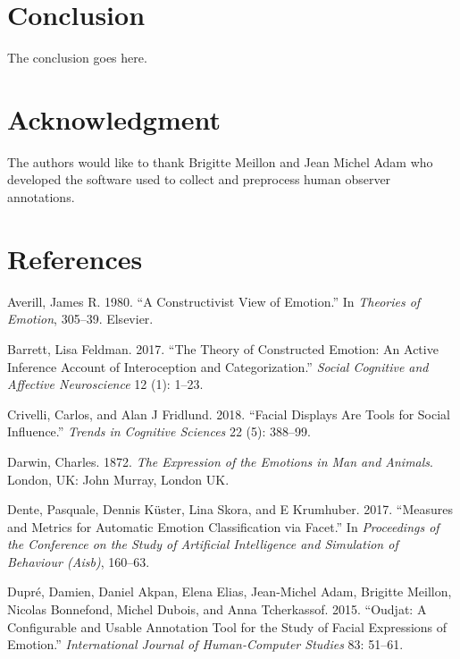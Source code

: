 \documentclass[conference,final,]{IEEEtran}
\begin{document}
\hypertarget{conclusion}{%
\section{Conclusion}\label{conclusion}}

The conclusion goes here.

\hypertarget{acknowledgment}{%
\section{Acknowledgment}\label{acknowledgment}}

The authors would like to thank Brigitte Meillon and Jean Michel Adam
who developed the software used to collect and preprocess human observer
annotations.

\hypertarget{references}{%
\section*{References}\label{references}}

\hypertarget{refs}{}
\leavevmode\hypertarget{ref-averill1980constructivist}{}%
Averill, James R. 1980. ``A Constructivist View of Emotion.'' In
\emph{Theories of Emotion}, 305--39. Elsevier.

\leavevmode\hypertarget{ref-barrett2017theory}{}%
Barrett, Lisa Feldman. 2017. ``The Theory of Constructed Emotion: An
Active Inference Account of Interoception and Categorization.''
\emph{Social Cognitive and Affective Neuroscience} 12 (1): 1--23.

\leavevmode\hypertarget{ref-crivelli2018facial}{}%
Crivelli, Carlos, and Alan J Fridlund. 2018. ``Facial Displays Are Tools
for Social Influence.'' \emph{Trends in Cognitive Sciences} 22 (5):
388--99.

\leavevmode\hypertarget{ref-darwin1872expression}{}%
Darwin, Charles. 1872. \emph{The Expression of the Emotions in Man and
Animals}. London, UK: John Murray, London UK.

\leavevmode\hypertarget{ref-dente2017measures}{}%
Dente, Pasquale, Dennis Küster, Lina Skora, and E Krumhuber. 2017.
``Measures and Metrics for Automatic Emotion Classification via Facet.''
In \emph{Proceedings of the Conference on the Study of Artificial
Intelligence and Simulation of Behaviour (Aisb)}, 160--63.

\leavevmode\hypertarget{ref-dupre2015oudjat}{}%
Dupré, Damien, Daniel Akpan, Elena Elias, Jean-Michel Adam, Brigitte
Meillon, Nicolas Bonnefond, Michel Dubois, and Anna Tcherkassof. 2015.
``Oudjat: A Configurable and Usable Annotation Tool for the Study of
Facial Expressions of Emotion.'' \emph{International Journal of
Human-Computer Studies} 83: 51--61.
\end{document}
